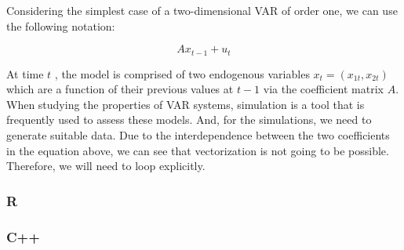 \documentclass[]{article}
\newenvironment{Shaded}{\begin{snugshade}}{\end{snugshade}}
\newcommand{\KeywordTok}[1]{\textcolor[rgb]{0.13,0.29,0.53}{\textbf{#1}}}
\newcommand{\DataTypeTok}[1]{\textcolor[rgb]{0.13,0.29,0.53}{#1}}
\newcommand{\DecValTok}[1]{\textcolor[rgb]{0.00,0.00,0.81}{#1}}
\newcommand{\FloatTok}[1]{\textcolor[rgb]{0.00,0.00,0.81}{#1}}
\newcommand{\StringTok}[1]{\textcolor[rgb]{0.31,0.60,0.02}{#1}}
\newcommand{\ControlFlowTok}[1]{\textcolor[rgb]{0.13,0.29,0.53}{\textbf{#1}}}
\newcommand{\OperatorTok}[1]{\textcolor[rgb]{0.81,0.36,0.00}{\textbf{#1}}}
\newcommand{\NormalTok}[1]{#1}
\begin{document}
Considering the simplest case of a two-dimensional VAR of order one, we
can use the following notation:

\[Ax_{t-1} + u_t\]

At time \(t\) , the model is comprised of two endogenous variables
\(x_t = (x_{1t} , x_{2t})\) which are a function of their previous
values at \(t - 1\) via the coefficient matrix \(A\). When studying the
properties of VAR systems, simulation is a tool that is frequently used
to assess these models. And, for the simulations, we need to generate
suitable data. Due to the interdependence between the two coefficients
in the equation above, we can see that vectorization is not going to be
possible. Therefore, we will need to loop explicitly.

\subsubsection{R}\label{r-3}

\begin{Shaded}
\end{Shaded}

\subsubsection{C++}\label{c-3}
\end{document}
